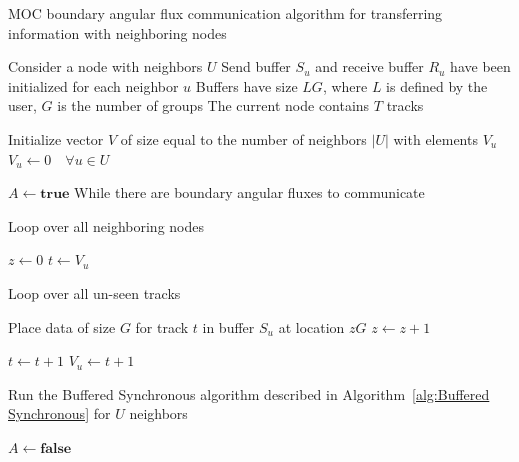\begin{algorithm*}[!h]
	\caption{MOC boundary angular flux communication algorithm for transferring information with neighboring nodes}
	\label{alg:moc-dd-transfer}
	\begin{algorithmic}
		\State Consider a node with neighbors $U$ \hspace{\fill}
		\State Send buffer $S_u$ and receive buffer $R_u$ have been initialized for each neighbor $u$ \hspace{\fill}
		\State Buffers have size $LG$, where $L$ is defined by the user, $G$ is the number of groups
		\State The current node contains $T$ tracks %
		
		
		\State Initialize vector $V$ of size equal to the number of neighbors $|U|$ with elements $V_u$
		\State $V_u \gets 0 \quad \forall u \in U$


		\vspace{0.1in}
		\State $A \gets \textbf{true}$
		 \Comment While there are boundary angular fluxes to communicate

		\vspace{0.1in}
		 \Comment Loop over all neighboring nodes
		\vspace{0.1in}
		
		\State $z \gets 0$
		\State $t \gets V_u$
		\vspace{0.1in}
		
		  \Comment Loop over all un-seen tracks
		\vspace{0.1in}
		
		\State Place data of size $G$ for track $t$ in buffer $S_u$ at location $zG$
		\State $z \gets z+1$
		\EndIf
		
		\State $t \gets t+1$
		\State $V_u \gets t+1$
		
		\EndWhile
		\EndFor
		
		\State Run the Buffered Synchronous algorithm described in Algorithm~\ref{alg:Buffered Synchronous} for $U$ neighbors
		
		\State $A \gets \textbf{false}$
		\EndIf
		
		\EndWhile
		
	\end{algorithmic}
\end{algorithm*}


